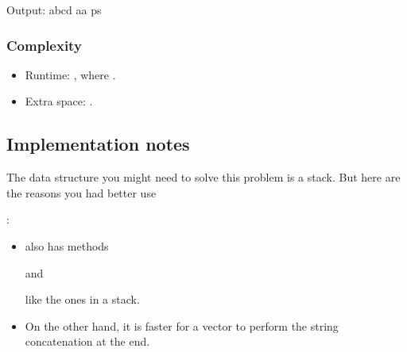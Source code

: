 \documentclass[letterpaper,12pt,english]{book}
\begin{document}
\begin{sphinxVerbatim}[commandchars=\\\{\}]
Output:
abcd
aa
ps
\end{sphinxVerbatim}


\subsubsection{Complexity}
\label{\detokenize{Stack/1209_Remove_All_Adjacent_Duplicates_in_String_II:complexity}}\begin{itemize}
\item {} 
\sphinxAtStartPar
Runtime: , where .

\item {} 
\sphinxAtStartPar
Extra space: .

\end{itemize}


\subsection{Implementation notes}
\label{\detokenize{Stack/1209_Remove_All_Adjacent_Duplicates_in_String_II:implementation-notes}}
\sphinxAtStartPar
The data structure  you might need to solve this problem is a stack. But here are the reasons you had better use %
\begin{footnote}[44]\sphinxAtStartFootnote
{}
%
\end{footnote}:
\begin{itemize}
\item {} 
\sphinxAtStartPar
{} also has methods %
\begin{footnote}[45]\sphinxAtStartFootnote
{}
%
\end{footnote} and %
\begin{footnote}[46]\sphinxAtStartFootnote
{}
%
\end{footnote} like the ones in a stack.

\item {} 
\sphinxAtStartPar
On the other hand, it is faster for a vector to perform the string concatenation at the end.

\end{itemize}
\end{document}
